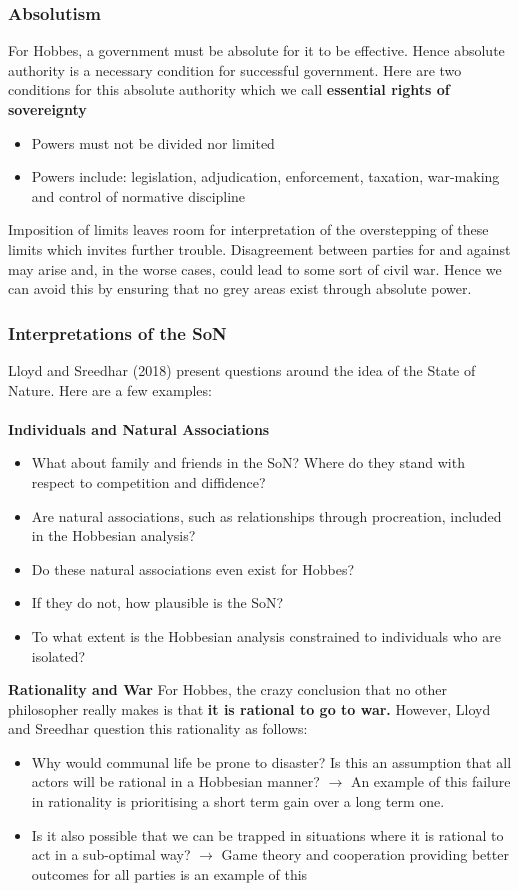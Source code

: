 \documentclass[12pt, letterpaper]{article}
\begin{document}
\subsubsection{Absolutism}
For Hobbes, a government must be absolute for it to be effective. Hence absolute authority is a necessary condition for successful government. Here are two conditions for this absolute authority which we call \textbf{essential rights of sovereignty}
\begin{itemize}
	\item Powers must not be divided nor limited
	\item Powers include: legislation, adjudication, enforcement, taxation, war-making and control of normative discipline
\end{itemize}
Imposition of limits leaves room for interpretation of the overstepping of these limits which invites further trouble. Disagreement between parties for and against may arise and, in the worse cases, could lead to some sort of civil war. Hence we can avoid this by ensuring that no grey areas exist through absolute power.

\subsubsection{Interpretations of the SoN}
Lloyd and Sreedhar (2018) present questions around the idea of the State of Nature. Here are a few examples:\\\\
\textbf{Individuals and Natural Associations}
\begin{itemize}
	\item What about family and friends in the SoN? Where do they stand with respect to competition and diffidence?
	\item Are natural associations, such as relationships through procreation, included in the Hobbesian analysis?
	\item Do these natural associations even exist for Hobbes?
	\item If they do not, how plausible is the SoN?
	\item To what extent is the Hobbesian analysis constrained to individuals who are isolated?\\
\end{itemize}
\textbf{Rationality and War}
For Hobbes, the crazy conclusion that no other philosopher really makes is that \textbf{it is rational to go to war.} However, Lloyd and Sreedhar question this rationality as follows:
\begin{itemize}
	\item Why would communal life be prone to disaster? Is this an assumption that all actors will be rational in a Hobbesian manner? $\rightarrow$ An example of this failure in rationality is prioritising a short term gain over a long term one.
	\item Is it also possible that we can be trapped in situations where it is rational to act in a sub-optimal way? $\rightarrow$ Game theory and cooperation providing better outcomes for all parties is an example of this
\end{itemize}
\end{document}
